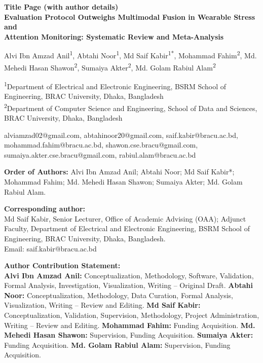 \documentclass[11pt,a4paper]{article}
\begin{document}
\thispagestyle{empty}
\begin{center}
{\bfseries\large Title Page (with author details)}\\[14pt]
{\large\bfseries Evaluation Protocol Outweighs Multimodal Fusion in Wearable Stress and\\[2pt]
Attention Monitoring: Systematic Review and Meta-Analysis}\\[14pt]
\end{center}

Alvi Ibn Amzad Anil\textsuperscript{1}, Abtahi Noor\textsuperscript{1},
Md Saif Kabir\textsuperscript{1*}, Mohammad Fahim\textsuperscript{2},
Md. Mehedi Hasan Shawon\textsuperscript{2}, Sumaiya Akter\textsuperscript{2},
Md. Golam Rabiul Alam\textsuperscript{2}

\vspace{6pt}
\textsuperscript{1}Department of Electrical and Electronic Engineering, BSRM School of
Engineering, BRAC University, Dhaka, Bangladesh\\
\textsuperscript{2}Department of Computer Science and Engineering, School of Data and
Sciences, BRAC University, Dhaka, Bangladesh

\vspace{6pt}
alviamzad02@gmail.com, abtahinoor20@gmail.com, saif.kabir@bracu.ac.bd,
mohammad.fahim@bracu.ac.bd, shawon.cse.bracu@gmail.com,
sumaiya.akter.cse.bracu@gmail.com, rabiul.alam@bracu.ac.bd

\vspace{10pt}
\textbf{Order of Authors:} Alvi Ibn Amzad Anil; Abtahi Noor; Md Saif Kabir*;
Mohammad Fahim; Md. Mehedi Hasan Shawon; Sumaiya Akter; Md. Golam Rabiul Alam.

\vspace{10pt}
\textbf{Corresponding author:}\\
Md Saif Kabir, Senior Lecturer, Office of Academic Advising (OAA);
Adjunct Faculty, Department of Electrical and Electronic Engineering,
BSRM School of Engineering, BRAC University, Dhaka, Bangladesh.\\
Email: saif.kabir@bracu.ac.bd

\vspace{10pt}
\textbf{Author Contribution Statement:}\\
\textbf{Alvi Ibn Amzad Anil:} Conceptualization, Methodology, Software, Validation, Formal
Analysis, Investigation, Visualization, Writing -- Original Draft.
\textbf{Abtahi Noor:} Conceptualization, Methodology, Data Curation, Formal Analysis,
Visualization, Writing -- Review and Editing.
\textbf{Md Saif Kabir:} Conceptualization, Validation, Supervision, Methodology, Project
Administration, Writing -- Review and Editing.
\textbf{Mohammad Fahim:} Funding Acquisition.
\textbf{Md. Mehedi Hasan Shawon:} Supervision, Funding Acquisition.
\textbf{Sumaiya Akter:} Funding Acquisition.
\textbf{Md. Golam Rabiul Alam:} Supervision, Funding Acquisition.
\end{document}
